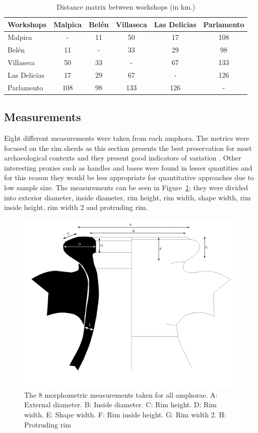 \documentclass[review]{elsarticle}
\begin{document}
\begin{table}[htp]
\centering

\begin{tabular}{lccccc}
\hline

\textbf{Workshops} & Malpica & Belén & Villaseca & Las Delicias & Parlamento \\ \hline
Malpica & - & 11 & 50 & 17 & 108 \\
Belén & 11 & - & 33 & 29 & 98 \\
Villaseca & 50 & 33 & - & 67 & 133 \\
Las Delicias & 17 & 29 & 67 & - & 126 \\
Parlamento & 108 & 98 & 133 & 126 & - \\
\hline
\end{tabular}
\caption{Distance matrix between workshops (in km.)}
\label{table:distances}
\end{table}

\subsection{Measurements}

Eight different measurements were taken from each amphora. The metrics were focused on the rim sherds as this section presents the best preservation for most archaeological contexts and they present good indicators of variation \citep{berni_millet_epigrafianforica_2008}. Other interesting proxies such as handles and bases were found in lesser quantities and for this reason they would be less appropriate for quantitative approaches due to low sample size. The measurements can be seen in Figure~\ref{mesures}; they were divided into exterior diameter, inside diameter, rim height, rim width, shape width, rim inside height, rim width 2 and protruding rim.

\begin{figure}[htp]
	\centering
\includegraphics[width=\linewidth]{figs/mesures.pdf}
\caption{The 8 morphometric measurements taken for all amphorae. A: External diameter. B: Inside diameter. C: Rim height. D: Rim width. E: Shape width. F: Rim inside height. G: Rim width 2. H: Protruding rim}
\label{mesures}
\end{figure} 
\end{document}
